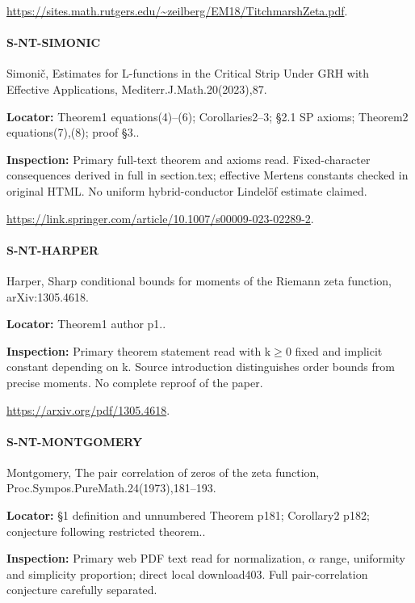 \documentclass[11pt,a4paper]{article}
\begin{document}
\url{https://sites.math.rutgers.edu/~zeilberg/EM18/TitchmarshZeta.pdf}.

\paragraph{S-NT-SIMONIC} Simonič, Estimates for L-functions in the Critical Strip Under GRH with Effective Applications, Mediterr.\allowbreak{}J.\allowbreak{}Math.\allowbreak{}20(2023),87.

\textbf{Locator:} Theorem1 equations(4)–\allowbreak{}(6); Corollaries2–\allowbreak{}3; §2.\allowbreak{}1 SP axioms; Theorem2 equations(7),(8); proof §3.\allowbreak{}.

\textbf{Inspection:} Primary full-text theorem and axioms read.\allowbreak{} Fixed-character consequences derived in full in section.\allowbreak{}tex; effective Mertens constants checked in original HTML.\allowbreak{} No uniform hybrid-conductor Lindelöf estimate claimed.\allowbreak{}

\url{https://link.springer.com/article/10.1007/s00009-023-02289-2}.

\paragraph{S-NT-HARPER} Harper, Sharp conditional bounds for moments of the Riemann zeta function, arXiv:\allowbreak{}1305.\allowbreak{}4618.

\textbf{Locator:} Theorem1 author p1.\allowbreak{}.

\textbf{Inspection:} Primary theorem statement read with k\ensuremath{\ge}0 fixed and implicit constant depending on k.\allowbreak{} Source introduction distinguishes order bounds from precise moments.\allowbreak{} No complete reproof of the paper.\allowbreak{}

\url{https://arxiv.org/pdf/1305.4618}.

\paragraph{S-NT-MONTGOMERY} Montgomery, The pair correlation of zeros of the zeta function, Proc.\allowbreak{}Sympos.\allowbreak{}PureMath.\allowbreak{}24(1973),181–\allowbreak{}193.

\textbf{Locator:} §1 definition and unnumbered Theorem p181; Corollary2 p182; conjecture following restricted theorem.\allowbreak{}.

\textbf{Inspection:} Primary web PDF text read for normalization, \ensuremath{\alpha} range, uniformity and simplicity proportion; direct local download403.\allowbreak{} Full pair-correlation conjecture carefully separated.\allowbreak{}
\end{document}
